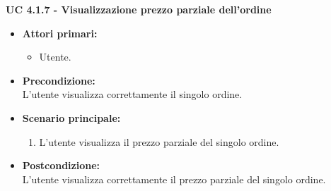 \vspace{0.5cm}

\noindent \textbf{\large UC 4.1.7 - Visualizzazione prezzo parziale dell'ordine}
\label{uc:visualizzazione-prezzo-parziale-ord}
\begin{itemize}

	\item \textbf{Attori primari: }
		\begin{itemize}
			\item Utente.
		\end{itemize}

	\item \textbf{Precondizione: }\\[0.3cm]
		L'utente visualizza correttamente il singolo ordine.

	\item \textbf{Scenario principale: }
		\begin{enumerate}
			\item L'utente visualizza il prezzo parziale del singolo ordine.
		\end{enumerate}
		

	\item \textbf{Postcondizione: }\\[0.3cm]
		L'utente visualizza correttamente il prezzo parziale del singolo ordine.

\end{itemize}

\vspace{0.5cm}

